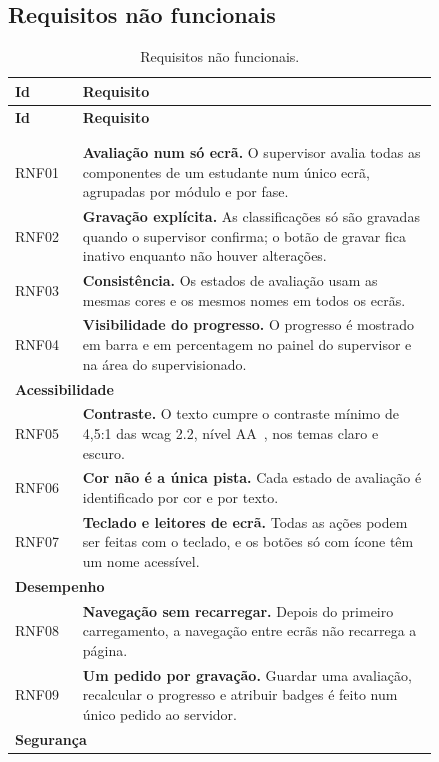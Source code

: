 \subsection{Requisitos não funcionais}

\begingroup\small
\begin{longtable}{lp{0.84\linewidth}}
\toprule
\textbf{Id} & \textbf{Requisito} \\
\midrule
\endfirsthead
\toprule
\textbf{Id} & \textbf{Requisito} \\
\midrule
\endhead
\bottomrule
\endfoot
\bottomrule
\caption{Requisitos não funcionais.}\label{tab:rnf}\\
\endlastfoot
\multicolumn{2}{l}{\textbf{Usabilidade}} \\
RNF01 & \textbf{Avaliação num só ecrã.} O supervisor avalia todas as componentes de um estudante num único ecrã, agrupadas por módulo e por fase. \\
RNF02 & \textbf{Gravação explícita.} As classificações só são gravadas quando o supervisor confirma; o botão de gravar fica inativo enquanto não houver alterações. \\
RNF03 & \textbf{Consistência.} Os estados de avaliação usam as mesmas cores e os mesmos nomes em todos os ecrãs. \\
RNF04 & \textbf{Visibilidade do progresso.} O progresso é mostrado em barra e em percentagem no painel do supervisor e na área do supervisionado. \\
\midrule
\multicolumn{2}{l}{\textbf{Acessibilidade}} \\
RNF05 & \textbf{Contraste.} O texto cumpre o contraste mínimo de 4,5:1 das \gls{wcag} 2.2, nível AA~\citep{w3c-wcag22}, nos temas claro e escuro. \\
RNF06 & \textbf{Cor não é a única pista.} Cada estado de avaliação é identificado por cor e por texto. \\
RNF07 & \textbf{Teclado e leitores de ecrã.} Todas as ações podem ser feitas com o teclado, e os botões só com ícone têm um nome acessível. \\
\midrule
\multicolumn{2}{l}{\textbf{Desempenho}} \\
RNF08 & \textbf{Navegação sem recarregar.} Depois do primeiro carregamento, a navegação entre ecrãs não recarrega a página. \\
RNF09 & \textbf{Um pedido por gravação.} Guardar uma avaliação, recalcular o progresso e atribuir badges é feito num único pedido ao servidor. \\
\midrule
\multicolumn{2}{l}{\textbf{Segurança}} \\

\end{longtable}
